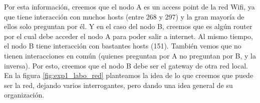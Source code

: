 \par Por esta información, creemos que el nodo A es un access point de la red Wifi, ya que tiene interacción con muchos hosts (entre 268 y 297) y la gran mayoría de ellos solo preguntan por él. Y en el caso del nodo B, creemos que es algún router por el cual debe acceder el nodo A para poder salir a internet. Al mismo tiempo, el nodo B tiene interacción con bastantes hosts (151). También vemos que no tienen interacciones en común (quienes preguntan por A no preguntan por B, y la inversa). Por esto, creemos que el nodo B debe ser el gateway de otra red local. En la figura \ref{fig:exp1_labo_red} planteamos la idea de lo que creemos que puede ser la red, dejando varios interrogantes, pero dando una idea general de su organización.
